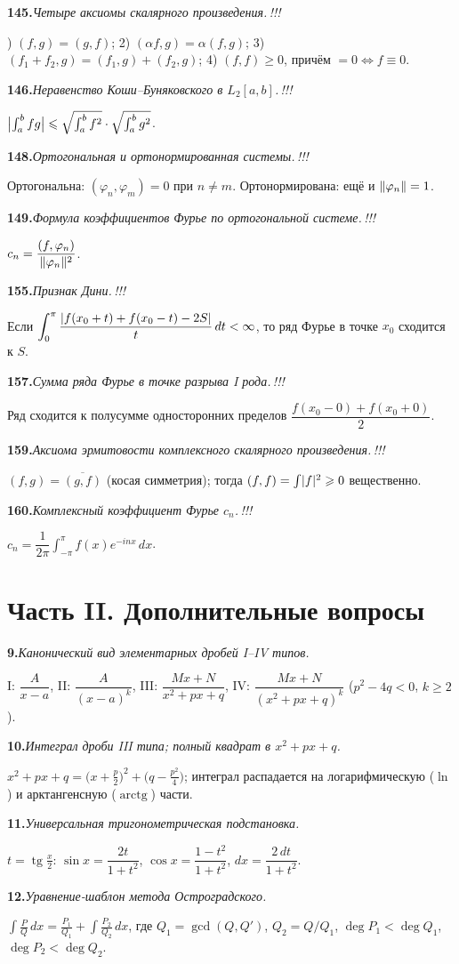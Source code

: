 \documentclass[10pt,a4paper]{article}
\DeclareMathOperator{\tg}{tg}
\DeclareMathOperator{\arctg}{arctg}
\newcommand{\dx}{\,dx}
\newcommand{\dt}{\,dt}
\renewcommand{\le}{\leqslant}
\renewcommand{\ge}{\geqslant}
\DeclarePairedDelimiter{\abs}{\lvert}{\rvert}
\DeclarePairedDelimiter{\norm}{\lVert}{\rVert}
\theoremstyle{definition}
\theoremstyle{plain}
\newcommand{\writespace}{\vspace{7.5mm}}
\newcommand{\tm}{\textcolor{teormin}{\,!!!}}
\newcommand{\faq}[3]{%
  \par\smallskip\noindent
  \textbf{#1.}\enspace\textit{#2}\par
  \nobreak\vspace{0.3ex}\noindent #3\par
  \writespace}
\begin{document}
\faq{145}{Четыре аксиомы скалярного произведения.\tm}{%
1) $(f,g)=(g,f)$; 2) $(\alpha f,g)=\alpha(f,g)$; 3) $(f_1+f_2,g)=(f_1,g)+(f_2,g)$;
4) $(f,f)\ge0$, причём $=0\iff f\equiv0$.}

\faq{146}{Неравенство Коши–Буняковского в $L_2[a,b]$.\tm}{%
$\abs[\big]{\int_a^b fg}\le\sqrt{\int_a^b f^2}\cdot\sqrt{\int_a^b g^2}$.}

\faq{148}{Ортогональная и ортонормированная системы.\tm}{%
Ортогональна: $(\varphi_n,\varphi_m)=0$ при $n\ne m$. Ортонормирована: ещё и $\norm{\varphi_n}=1$.}

\faq{149}{Формула коэффициентов Фурье по ортогональной системе.\tm}{%
$c_n=\dfrac{(f,\varphi_n)}{\norm{\varphi_n}^2}$.}

\faq{155}{Признак Дини.\tm}{%
Если $\displaystyle\int_0^\pi\frac{\abs{f(x_0+t)+f(x_0-t)-2S}}{t}\dt<\infty$, то ряд Фурье в точке
$x_0$ сходится к $S$.}

\faq{157}{Сумма ряда Фурье в точке разрыва I рода.\tm}{%
Ряд сходится к полусумме односторонних пределов $\dfrac{f(x_0-0)+f(x_0+0)}{2}$.}

\faq{159}{Аксиома эрмитовости комплексного скалярного произведения.\tm}{%
$(f,g)=\overline{(g,f)}$ (косая симметрия); тогда $(f,f)=\int\abs{f}^2\ge0$ вещественно.}

\faq{160}{Комплексный коэффициент Фурье $c_n$.\tm}{%
$c_n=\dfrac1{2\pi}\int_{-\pi}^\pi f(x)e^{-inx}\dx$.}

\section{Часть II. Дополнительные вопросы}

\faq{9}{Канонический вид элементарных дробей I–IV типов.}{%
I: $\dfrac{A}{x-a}$,\; II: $\dfrac{A}{(x-a)^k}$,\; III: $\dfrac{Mx+N}{x^2+px+q}$,\;
IV: $\dfrac{Mx+N}{(x^2+px+q)^k}$ ($p^2-4q<0$, $k\ge2$).}

\faq{10}{Интеграл дроби III типа; полный квадрат в $x^2+px+q$.}{%
$x^2+px+q=\bigl(x+\tfrac p2\bigr)^2+\bigl(q-\tfrac{p^2}4\bigr)$; интеграл распадается на
логарифмическую ($\ln$) и арктангенсную ($\arctg$) части.}

\faq{11}{Универсальная тригонометрическая подстановка.}{%
$t=\tg\tfrac x2$: $\sin x=\dfrac{2t}{1+t^2}$, $\cos x=\dfrac{1-t^2}{1+t^2}$,
$dx=\dfrac{2\,dt}{1+t^2}$.}

\faq{12}{Уравнение-шаблон метода Остроградского.}{%
$\int\frac PQ\dx=\frac{P_1}{Q_1}+\int\frac{P_2}{Q_2}\dx$, где $Q_1=\gcd(Q,Q')$, $Q_2=Q/Q_1$,
$\deg P_1<\deg Q_1$, $\deg P_2<\deg Q_2$.}
\end{document}
